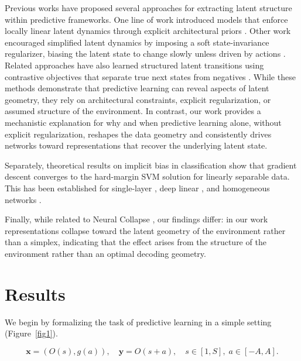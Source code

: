 \documentclass{article}
\begin{document}
Previous works have proposed several approaches for extracting latent structure within predictive frameworks. One line of work introduced models that enforce locally linear latent dynamics through explicit architectural priors \cite{watter2015embed}. Other work encouraged simplified latent dynamics by imposing a soft state-invariance regularizer, biasing the latent state to change slowly unless driven by actions \cite{saanum2024simplifying}. Related approaches have also learned structured latent transitions using contrastive objectives that separate true next states from negatives \cite{kipf2019contrastive}. While these methods demonstrate that predictive learning can reveal aspects of latent geometry, they rely on architectural constraints, explicit regularization, or assumed structure of the environment. In contrast, our work provides a mechanistic explanation for why and when predictive learning alone, without explicit regularization, reshapes the data geometry and consistently drives networks toward representations that recover the underlying latent state.

Separately, theoretical results on implicit bias in classification show that gradient descent converges to the hard-margin SVM solution for linearly separable data. This has been established for single-layer \citep{soudry2018implicit}, deep linear \citep{ji2018gradient}, and homogeneous networks \citep{lyu2019gradient}.

Finally, while related to Neural Collapse \citep{papyan2020prevalence}, our findings differ: in our work representations collapse toward the latent geometry of the environment rather than a simplex, indicating that the effect arises from the structure of the environment rather than an optimal decoding geometry.



\section{Results}

We begin by formalizing the task of predictive learning in a simple setting (Figure~\ref{fig1}).  

\[
\mathbf{x} = (O(s), g(a)), \quad \mathbf{y} = O(s+a), \quad s \in [1, S], \; a \in [-A, A].
\]
\end{document}
